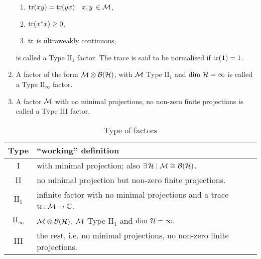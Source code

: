 \begin{definition}
\begin{enumerate}
         {\centering
         \begin{enumerate}
          \item $\operatorname{tr}(xy)=\operatorname{tr}(yx)\quad x,y\,\in\mathcal{M}$,
          \item $\operatorname{tr}(x^* x)\geq 0$,
          \item $\operatorname{tr}$ is ultraweakly continuous,
         \end{enumerate}
         }
         is called a Type $\textrm{II}_1$ factor. The trace is said
         to be normalised if $\operatorname{tr}(\bm{1})=1$.
  \item  A factor of the form $\mathcal{M}\otimes\mathcal{B}(\mathcal{H})$, with $\mathcal{M}$
         Type $\textrm{II}_1$ and $\textrm{dim}\ \mathcal{H} =\infty$
         is called a Type $\textrm{II}_{\infty}$ factor.
  \item  A factor $\mathcal{M}$ with no minimal projections, no non-zero
         finite projections is called a Type III factor.
  \end{enumerate}
  \begin{table}[tb]
  \caption{Type of factors}
  \centering
   \begin{tabular}{cp{}}
   \toprule
   Type & ``working'' definition\\
   \midrule
   I & with minimal projection; also $\exists\,\mathcal{H}\mid \mathcal{M} \cong \mathcal{B}(\mathcal{H})$.\\[0.5ex]
   II & no minimal projection but non-zero finite projections.\\[0.5ex]
   $\textrm{II}_1$ & infinite factor with no minimal projections
                   and a trace $\operatorname{tr}\colon \mathcal{M}\to\mathbb{C}$.\\[0.5ex]   
   $\textrm{II}_{\infty}$ & $\vN\otimes\bh,\ \vN$ Type $\textrm{II}_1$
                            and $\textrm{dim}\ \mathcal{H} =\infty.$\\[0.5ex]                           
   III & the rest, i.e. no minimal projections, no non-zero finite projections.\\
   \bottomrule
   \end{tabular}
  \end{table} 
 \end{definition}

